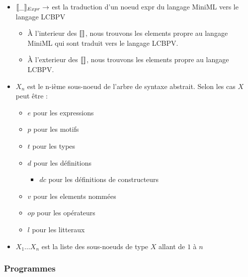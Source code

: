 \documentclass[12pt]{article}
\begin{document}
\begin{itemize}
      \tightlist
      \item
            $\llbracket \_ \rrbracket_{Expr}  \rightarrow $ est la traduction d'un noeud expr du langage MiniML vers le langage LCBPV
            \begin{itemize}
                  \tightlist
                  \item
                        À l'interieur des $\llbracket  \rrbracket$, nous trouvons les elements propre au langage MiniML qui sont traduit vers le langage LCBPV.
                  \item
                        À l'exterieur des $\llbracket  \rrbracket$, nous trouvons les elements propre au langage LCBPV.
            \end{itemize}
      \item
            $X_n$ est le n-ième sous-noeud de l'arbre de syntaxe abstrait. \newline
            Selon les cas $X$ peut être :
            \begin{itemize}
                  \tightlist
                  \item
                        $e$ pour les expressions
                  \item
                        $p$ pour les motifs
                  \item
                        $t$ pour les types
                  \item
                        $d$ pour les définitions
                        \begin{itemize}
                              \tightlist
                              \item
                                    $dc$ pour les définitions de constructeurs
                        \end{itemize}
                  \item
                        $v$ pour les elements nommées
                  \item
                        $op$ pour les opérateurs
                  \item
                        $l$ pour les litteraux
            \end{itemize}
      \item
            $X_1 \dots X_n$ est la liste des sous-noeuds de type $X$ allant de $1$ à $n$
\end{itemize}


\hypertarget{programmes-1}{%
      \subsubsection*{Programmes}\label{programmes-1}}
\end{document}
